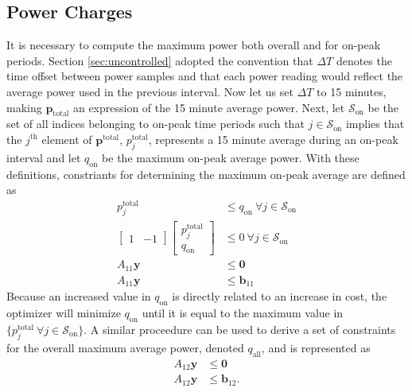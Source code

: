 \subsection{Power Charges}
It is necessary to compute the maximum power both overall and for on-peak periods. Section \ref{sec:uncontrolled} adopted the convention that $\Delta T$ denotes the time offset between power samples and that each power reading would reflect the average power used in the previous interval. Now let us set $\Delta T$ to 15 minutes, making $\mathbf{p}_{\text{total}}$ an expression of the 15 minute average power. Next, let $\mathcal{S}_{\text{on}}$ be the set of all indices belonging to on-peak time periods such that $j\in \mathcal{S}_{\text{on}}$ implies that the $j^{\text{th}}$ element of $\mathbf{p}^{\text{total}}$, $p_j^{\text{total}}$, represents a 15 minute average during an on-peak interval and let $q_{\text{on}}$ be the maximum on-peak average power.  With these definitions, constriants for determining the maximum on-peak average are defined as
\begin{equation} \begin{aligned}
	p_j^{\text{total}} &\le q_{\text{on}} \ \forall j \in \mathcal{S}_{\text{on}} \\
	\begin{bmatrix} 1 & -1\end{bmatrix} \begin{bmatrix}p_j^{\text{total}} \\ q_{\text{on}} \end{bmatrix} &\le 0 \ \forall j \in \mathcal{S}_{\text{on}}\\
		A_{11}\mathbf{y} &\le \mathbf{0} \\
		A_{11}\mathbf{y} &\le \mathbf{b}_{11}
\end{aligned} \end{equation}
Because an increased value in $q_{\text{on}}$ is directly related to an increase in cost, the optimizer will minimize $q_{\text{on}}$ until it is equal to the maximum value in $\{p_j^{\text{total}} \ \forall j \in \mathcal{S}_{\text{on}}\}$. A similar proceedure can be used to derive a set of constraints for the overall maximum average power, denoted $q_{\text{all}}$, and is represented as
\begin{equation} \begin{aligned}
	A_{12}\mathbf{y} &\le  \mathbf{0} \\
	A_{12}\mathbf{y} &\le \mathbf{b}_{12}.
\end{aligned} \end{equation}
